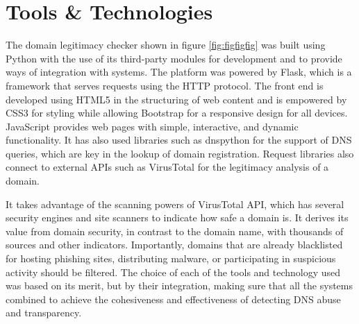 \section{Tools \& Technologies}

The domain legitimacy checker shown in figure \ref{fig:figfigfig} was built using Python with the use of its third-party modules for development and to provide ways of integration with systems. The platform was powered by Flask, which is a framework that serves requests using the HTTP protocol. The front end is developed using HTML5 in the structuring of web content and is empowered by CSS3 for styling while allowing Bootstrap for a responsive design for all devices. JavaScript provides web pages with simple, interactive, and dynamic functionality. It has also used libraries such as dnspython for the support of DNS queries, which are key in the lookup of domain registration. Request libraries also connect to external APIs such as VirusTotal for the legitimacy analysis of a domain.


It takes advantage of the scanning powers of VirusTotal API, which has several security engines and site scanners to indicate how safe a domain is. It derives its value from domain security, in contrast to the domain name, with thousands of sources and other indicators. Importantly, domains that are already blacklisted for hosting phishing sites, distributing malware, or participating in suspicious activity should be filtered. The choice of each of the tools and technology used was based on its merit, but by their integration, making sure that all the systems combined to achieve the cohesiveness and effectiveness of detecting DNS abuse and transparency.




